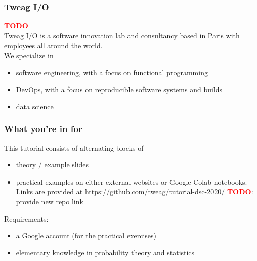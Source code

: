 \documentclass[t,aspectratio=169]{beamer}
\newcommand{\todo}{\textcolor{red}{\textbf{TODO}}}
\begin{document}
\begin{frame}
  \frametitle{Tweag I/O}
  \todo \\
  Tweag I/O is a software innovation lab and consultancy based in Paris with employees all around the world.\\
  We specialize in
  \begin{itemize}
  \item software engineering, with a focus on functional programming
  \item DevOps, with a focus on reproducible software systems and builds
  \item data science
  \end{itemize}
\end{frame}


\begin{frame}
  \frametitle{What you're in for}
  This tutorial consists of alternating blocks of
  \begin{itemize}
  \item theory / example slides
  \item practical examples on either external websites or Google Colab notebooks. Links are provided at {\centering \url{https://github.com/tweag/tutorial-dsc-2020/}} \todo: provide new repo link
  \end{itemize}

  Requirements:
  \begin{itemize}
  \item a Google account (for the practical exercises)
  \item elementary knowledge in probability theory and statistics
  \end{itemize}
\end{frame}


\end{document}
